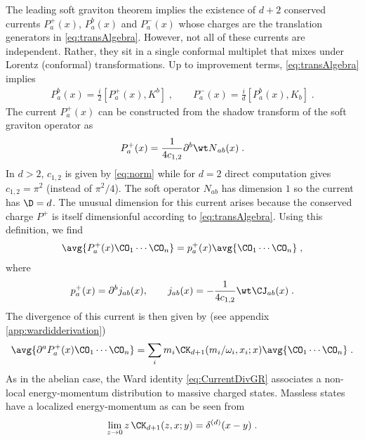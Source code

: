 \documentclass[11pt]{article}
\def\d{{\delta}}
\def\o{{\omega}}
\def\p{{\partial}}
\begin{document}
The leading soft graviton theorem implies the existence of $d+2$ conserved currents $P^+_a(x)$, $P^b_a(x)$ and $P^-_a(x)$ whose charges are the translation generators in \eqref{eq:transAlgebra}. However, not all of these currents are independent. Rather, they sit in a single conformal multiplet that mixes under Lorentz (conformal) transformations. Up to improvement terms, \eqref{eq:transAlgebra} implies
\begin{equation}
\begin{split}
P^b_a(x)  = \frac{i}{2} [ P^+_a(x) , K^b ] \; , \qquad  P^-_a (x)  = \frac{i}{d} [ P^b_a(x) , K_b ] \; . 
\end{split}
\end{equation}
The current $P^+_a(x)$ can be constructed from the shadow transform of the soft graviton operator as
\begin{equation}
\begin{split}\label{eq:TranslationCurrent}
P^+_a(x) = \frac{1}{4 c_{1,2} } \p^b {\wt N}_{ab}(x) \; .
\end{split}
\end{equation}
In $d>2$, $c_{1,2}$ is given by \eqref{eq:norm} while for $d=2$ direct computation gives $c_{1,2} = \pi^2$ (instead of $\pi^2/4$). The soft operator $N_{ab}$ has dimension $1$ so the current has $\D = d$. The unusual dimension for this current arises because the conserved charge $P^+$ is itself dimensionful according to \eqref{eq:transAlgebra}. Using this definition, we find
\begin{equation}
\begin{split}
\avg{ P^+_a(x) \CO_1 \cdots \CO_n } = p_a^+(x) \avg{ \CO_1 \cdots \CO_n } \; , 
\end{split}
\end{equation}
where
\begin{equation}
\begin{split}\label{jabdef-gr}
p^+_a(x) =  \p^b j_{ab}(x) , \qquad j_{ab}(x) =  -\frac{1}{4c_{1,2}} {\wt \CJ}_{ab}(x) \;. 
\end{split}
\end{equation}
The divergence of this current is then given by (see appendix \ref{app:wardidderivation})
\begin{equation}
\begin{split}\label{eq:CurrentDivGR}
\avg{ \p^a P^+_a(x) \CO_1 \cdots \CO_n } =  \sum_i m_i \CK_{d+1} ( m_i/\o_i , x_i ; x ) \avg{  \CO_1 \cdots \CO_n } \; .
\end{split}
\end{equation}
As in the abelian case, the Ward identity \eqref{eq:CurrentDivGR} associates a non-local energy-momentum distribution to massive charged states. Massless states have a localized energy-momentum as can be seen from
\begin{equation}
\begin{split}
\lim_{z \to 0} z \,  \CK_{d+1} ( z , x ; y ) = \d^{(d)} ( x - y ) \; . 
\end{split}
\end{equation}
\end{document}
